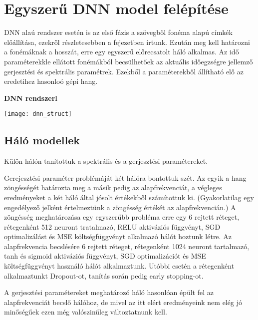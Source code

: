 \section{Egyszerű DNN model felépítése}

DNN alaú rendszer esetén is az első fázis a szövegből fonéma alapú címkék előállítása, ezekről részletesebben a fejezetben írtunk. Ezután meg kell határozni a fonémáknak a hosszát, erre egy egyszerű előrecsatolt háló alkalmas. Az idő paraméterekkle ellátott fonémákból becsülhetőek az aktuális időegzségre jellemző gerjesztési és spektrális paramétrek. Ezekből a paraméterekből állítható elő az eredetihez hasonloó gépi hang.

\begin{centering}
	\textbf{DNN rendszerl}\par\medskip\centering
	\texttt{[image: dnn\_struct]}
\end{centering}

\subsection{Háló modellek}
Külön hálón tanítottuk a spektrális és a gerjesztési paramétereket. 

Gerejesztési paraméter problémáját két hálóra bontottuk szét. Az egyik a hang zöngésségét határozta meg a másik pedig az alapfrekvenciát, a végleges eredményeket a két háló által jósolt értékekből számítottuk ki. (Gyakorlatilag egy engedélyező jelként értelmeztünk a zöngésség értékét az alapfrekvencián.) A zöngésség meghatározása egy egyszerűbb probléma erre  egy 6 rejtett réteget, rétegenként 512 neuront tratalmazó, RELU aktiváziós függvényt, SGD optimalizálást és MSE költségfüggvényt alkalmazó hálót hoztunk létre. Az alapfrekvencia becslésére 6 rejtett réteget, rétegenként 1024 neuront tartalmazó, tanh és sigmoid aktiváziós függvényt, SGD optimalizációt és MSE költségfüggvényt használó hálót alkalmaztunk. Utóbbi esetén a rétegenként alkalmaztunkt Dropout-ot, tanítás során pedig early stopping-ot.

A gerjesztési paramétereket meghatározó háló hasonlóan épült fel az alapfrekvenciát becslő hálóhoz, de mivel az itt elért eredményeink nem elég jó minőségűek ezen még valószinűleg változtatnunk kell.

\begin{comment}
regi reszek

A továbbiakban egy DNN model alkalmazása olvasható. A megismert cimkéket továbbiakkal egészítettük ki, majd ez alapján generáltunk gerjesztési és spektrális paramétereket, amikből előállítható az audio.





Előrecsatolt mély neurális hálózatot építettünk fel, 6 rejtett réteggel, tanh és sigmoid aktivációs függvényekkel, SGD optimalizálóval és MSE költségfüggvénnyel. A háló rétegeire Dropoutot is használtunk. (/!TODO ref)
A megállást early stoppinggal detektáltuk.

/!TODO háló modell kép

\end{comment}
